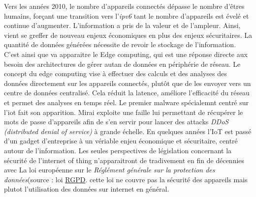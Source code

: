 \vspace{0.1cm}


Vers les années 2010, le nombre d'appareils connectés dépasse le nombre d'êtres humains, forçant une transition vers l'\textit{ipv6} tant le nombre d'appareils est évelé et continue d'augmenter. L'information a pris de la valeur et de l'ampleur. Ainsi, vient se greffer de nouveau enjeux économiques en plus des enjeux sécuritaires. La quantité de données générées nécessite de revoir le stockage de l'information. C'est ainsi que va apparaitre le Edge computing\cite{edge}, qui est une réponse directe aux besoin des architectures de gérer autan de données en périphérie de réseau. Le concept du edge computing vise à effectuer des calculs et des analyses des données directement sur les appareils connectés, plutôt que de les envoyer vers un centre de données centralisé. Cela réduit la latence, améliore l'efficacité du réseau et permet des analyses en temps réel. Le premier malware spécialemnt centré sur l'iot fait son apparition. Mirai\cite{Mirai} exploite une faille lui permettant de récupérer le mots de passe d'appareils afin de s'en servir pour lancer des attacks \textit{DDoS (distributed denial of service)} à grande échelle. En quelques années l'IoT est passé d'un gadget d'entreprise à un vériable enjeu économique et sécuritaire, centré autour de l'information. Les seules perspectives de législation concernant la sécurité de l'internet of thing n'apparaitront de tradivement en fin de décennies avec La loi européenne sur le \textit{Réglément générale sur la protection des données}(source : loi \href{https://commission.europa.eu/law/law-topic/data-protection/data-protection-eu_en}{RGPD}. cette loi ne couvre pas la sécurité des appareils mais plutot l'utilisation des données sur internet en général.

\vspace{0.1cm}

